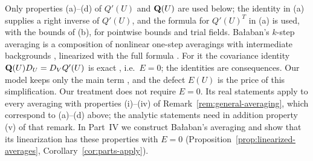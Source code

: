 \begin{remark}
Only properties (a)--(d) of $Q'(U)$ and $\mathbf Q(U)$ are used below; the identity in (a) supplies a right inverse of $Q'(U)$, and the formula for $Q'(U)^T$ in (a) is used, with the bounds of (b), for pointwise bounds and trial fields. Ba\l aban's $k$-step averaging is a composition of nonlinear one-step averagings with intermediate backgrounds \cite[(3.15)]{BalBackground}, linearized with the full formula \cite[(124)]{BalAvg}. For it the covariance identity $\mathbf Q(U)D_U=D_VQ'(U)$ is exact \cite[(3.114)--(3.115)]{BalBackground}, i.e.\ $E=0$; the identities \cite[(3.124), (3.152)]{BalBackground} are consequences. Our model keeps only the main term \cite[(125)]{BalAvg}, and the defect $E(U)$ is the price of this simplification. Our treatment does not require $E=0$. Its real statements apply to every averaging with properties (i)--(iv) of Remark~\ref{rem:general-averaging}, which correspond to (a)--(d) above; the analytic statements need in addition property (v) of that remark. In Part~IV we construct Ba\l aban's averaging and show that its linearization has these properties with $E=0$ (Proposition~\ref{prop:linearized-averages}, Corollary~\ref{cor:parts-apply}).
\end{remark}
